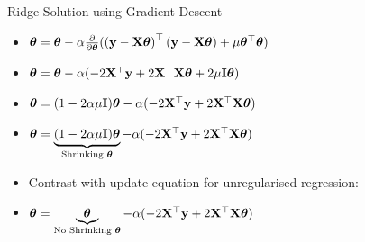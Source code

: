 \documentclass{beamer}
\begin{document}
\begin{frame}{Ridge Solution using Gradient Descent}
\begin{itemize}[<+->]
	\item \(\boldsymbol{\theta}=\boldsymbol{\theta} - \alpha \frac{\partial}{\partial \boldsymbol{\theta}}(\left(\mathbf{y}-\mathbf{X}\boldsymbol{\theta}\right)^{\top}\left(\mathbf{y}-\mathbf{X}\boldsymbol{\theta}\right)+\mu\boldsymbol{\theta}^{\top}\boldsymbol{\theta})\) 
	\item \(\boldsymbol{\theta}=\boldsymbol{\theta} - \alpha(-2 \mathbf{X}^{\top} \mathbf{y}+2 \mathbf{X}^{\top} \mathbf{X} \boldsymbol{\theta} + 2\mu \mathbf{I} \boldsymbol{\theta})\)
	\item \(\boldsymbol{\theta}=(1-2\alpha\mu \mathbf{I})\boldsymbol{\theta} - \alpha(-2 \mathbf{X}^{\top} \mathbf{y}+2 \mathbf{X}^{\top} \mathbf{X} \boldsymbol{\theta})\)
	\item \(\boldsymbol{\theta}=\underbrace{(1-2\alpha\mu \mathbf{I})\boldsymbol{\theta}}_\text{Shrinking $\boldsymbol{\theta}$} - \alpha(-2 \mathbf{X}^{\top} \mathbf{y}+2 \mathbf{X}^{\top} \mathbf{X} \boldsymbol{\theta})\)
\end{itemize}
\pause \begin{itemize}

	\item Contrast with update equation for unregularised regression:
	\item \(\boldsymbol{\theta}=\underbrace{\boldsymbol{\theta}}_\text{No Shrinking $\boldsymbol{\theta}$} - \alpha(-2 \mathbf{X}^{\top} \mathbf{y}+2 \mathbf{X}^{\top} \mathbf{X} \boldsymbol{\theta})\)
	
\end{itemize}

\end{frame}

{
	
}
\end{document}
